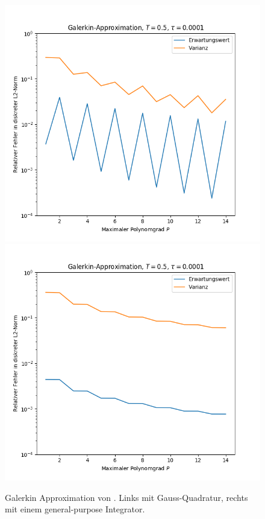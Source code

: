 \begin{figure}[!htb]
  \includegraphics[width=\linewidth]{Figures/galerkin_bydegree_trialsimple_gauss.png}
\endminipage
{}
  \includegraphics[width=\linewidth]{Figures/galerkin_bydegree_trial_simple_genpurp.png}
\endminipage
  \caption{Galerkin Approximation von . Links mit Gauss-Quadratur, rechts mit einem general-purpose Integrator.}
  \label{fig:galerkin_bydegree_trialdiscontsimple}
\end{figure}
